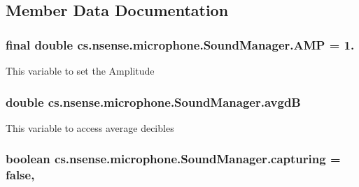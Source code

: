 \subsection{Member Data Documentation}
\hypertarget{classcs_1_1nsense_1_1microphone_1_1_sound_manager_a145a272b16be5038a5ad81e74fc8d865}{
\subsubsection[{A\-M\-P}]{\setlength{\rightskip}{0pt plus 5cm}final double cs.\-nsense.\-microphone.\-Sound\-Manager.\-A\-M\-P = 1.\hspace{0.3cm}{\ttfamily [static]}}}\label{classcs_1_1nsense_1_1microphone_1_1_sound_manager_a145a272b16be5038a5ad81e74fc8d865}
This variable to set the Amplitude \hypertarget{classcs_1_1nsense_1_1microphone_1_1_sound_manager_a20b7d00992d09dde85f8e995eb1fa2e3}{
\subsubsection[{avgd\-B}]{\setlength{\rightskip}{0pt plus 5cm}double cs.\-nsense.\-microphone.\-Sound\-Manager.\-avgd\-B\hspace{0.3cm}{\ttfamily [protected]}}}\label{classcs_1_1nsense_1_1microphone_1_1_sound_manager_a20b7d00992d09dde85f8e995eb1fa2e3}
This variable to access average decibles \hypertarget{classcs_1_1nsense_1_1microphone_1_1_sound_manager_aca562faaedb4f544f89803b63e10199b}{
\subsubsection[{capturing}]{\setlength{\rightskip}{0pt plus 5cm}boolean cs.\-nsense.\-microphone.\-Sound\-Manager.\-capturing = false\hspace{0.3cm}{\ttfamily [static]}, {\ttfamily [private]}}}\label{classcs_1_1nsense_1_1microphone_1_1_sound_manager_aca562faaedb4f544f89803b63e10199b}
